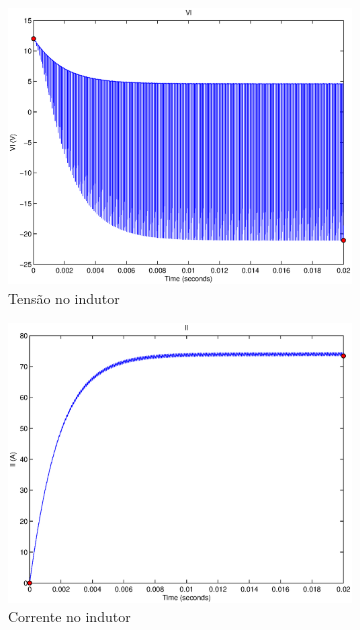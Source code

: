 \documentclass{article}
\begin{document}
\begin{figure}[H]
	\centering
	\begin{subfigure}[b]{0.4\linewidth}
		\includegraphics[width=\linewidth]{matlab/boost/b_vl}
		\caption{Tensão no indutor}
	\end{subfigure}
	\begin{subfigure}[b]{0.4\linewidth}
		\centering
		\includegraphics[width=\linewidth]{matlab/boost/b_il}
		\caption{Corrente no indutor}
	\end{subfigure}
	\begin{subfigure}[b]{0.4\linewidth}

\end{subfigure}
\end{figure}
\end{document}
